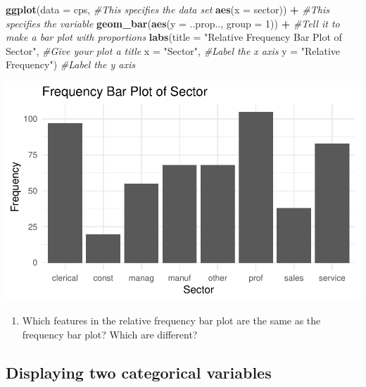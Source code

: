 \documentclass[
]{report}
\newenvironment{Shaded}{\begin{snugshade}}{\end{snugshade}}
\newcommand{\CommentTok}[1]{\textcolor[rgb]{0.56,0.35,0.01}{\textit{#1}}}
\newcommand{\DataTypeTok}[1]{\textcolor[rgb]{0.13,0.29,0.53}{#1}}
\newcommand{\DecValTok}[1]{\textcolor[rgb]{0.00,0.00,0.81}{#1}}
\newcommand{\KeywordTok}[1]{\textcolor[rgb]{0.13,0.29,0.53}{\textbf{#1}}}
\newcommand{\NormalTok}[1]{#1}
\newcommand{\OperatorTok}[1]{\textcolor[rgb]{0.81,0.36,0.00}{\textbf{#1}}}
\newcommand{\StringTok}[1]{\textcolor[rgb]{0.31,0.60,0.02}{#1}}
\providecommand{\tightlist}{%
  \setlength{\itemsep}{0pt}\setlength{\parskip}{0pt}}
\begin{document}
\begin{Shaded}
\begin{Highlighting}[]
\KeywordTok{ggplot}\NormalTok{(}\DataTypeTok{data =}\NormalTok{ cps,   }\CommentTok{\#This specifies the data set}
       \KeywordTok{aes}\NormalTok{(}\DataTypeTok{x =}\NormalTok{ sector)) }\OperatorTok{+}\StringTok{   }\CommentTok{\#This specifies the variable}
\StringTok{  }\KeywordTok{geom\_bar}\NormalTok{(}\KeywordTok{aes}\NormalTok{(}\DataTypeTok{y =}\NormalTok{ ..prop.., }\DataTypeTok{group =} \DecValTok{1}\NormalTok{)) }\OperatorTok{+}\StringTok{  }\CommentTok{\#Tell it to make a bar plot with proportions}
\StringTok{  }\KeywordTok{labs}\NormalTok{(}\DataTypeTok{title =} \StringTok{"Relative Frequency Bar Plot of Sector"}\NormalTok{,  }\CommentTok{\#Give your plot a title}
       \DataTypeTok{x =} \StringTok{"Sector"}\NormalTok{,   }\CommentTok{\#Label the x axis}
       \DataTypeTok{y =} \StringTok{"Relative Frequency"}\NormalTok{)  }\CommentTok{\#Label the y axis}
\end{Highlighting}
\end{Shaded}

\begin{center}\includegraphics[width=0.5\linewidth]{03-EDA-categorical_files/figure-latex/unnamed-chunk-3-1} \end{center}

\begin{enumerate}
\def\labelenumi{\arabic{enumi}.}
\setcounter{enumi}{4}
\tightlist
\item
  Which features in the relative frequency bar plot are the same as the frequency bar plot? Which are different?
\end{enumerate}

\vspace{1in}

\hypertarget{displaying-two-categorical-variables}{%
\subsection{Displaying two categorical variables}\label{displaying-two-categorical-variables}}
\end{document}
